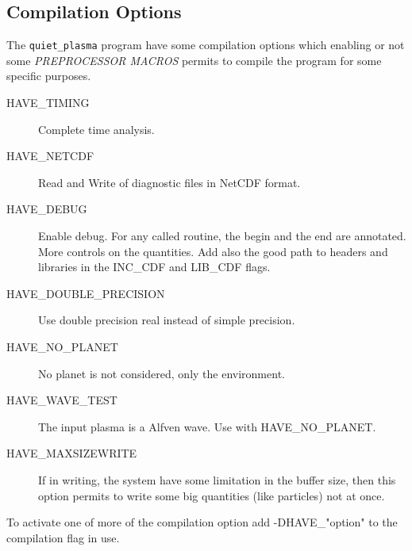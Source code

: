 \documentclass{article}
\begin{document}
\subsection{Compilation Options}
The {\tt quiet\_plasma} program have some compilation options
which enabling or not some {\it PREPROCESSOR MACROS} permits to
compile the program for some specific purposes.
\begin{description}
\item[{\sf HAVE\_TIMING}] Complete time analysis.
\item[{\sf HAVE\_NETCDF}] Read and Write of diagnostic files in NetCDF format.
\item[{\sf HAVE\_DEBUG}] Enable debug. For any called routine, the begin
  and the end are annotated. More controls on the quantities.
  Add also the good path to headers and libraries in the {\sf INC\_CDF}
  and {\sf LIB\_CDF} flags.
\item[{\sf HAVE\_DOUBLE\_PRECISION}] Use double precision real instead
  of simple precision.
\item[{\sf HAVE\_NO\_PLANET}] No planet is not considered, only the environment.
\item[{\sf HAVE\_WAVE\_TEST}] The input plasma is a Alfven wave. Use
  with {\sf HAVE\_NO\_PLANET}.
\item[{\sf HAVE\_MAXSIZEWRITE}] If in writing, the system have some
  limitation in the buffer size, then this option permits to write
  some big quantities (like particles) not at once.
\end{description}

To activate one of more of the compilation option add
{-DHAVE\_"option"} to the compilation flag in use.
\end{document}
